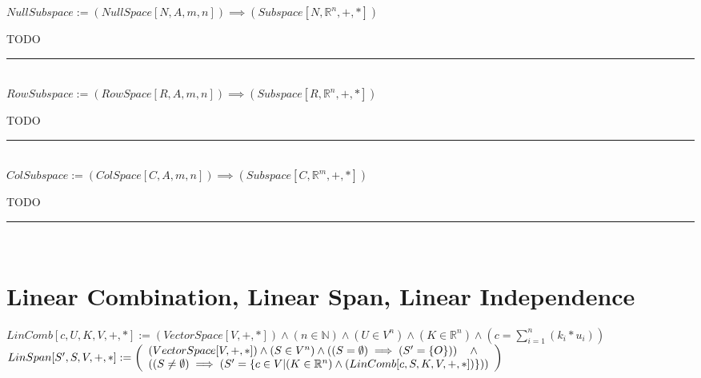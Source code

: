\documentclass{book}
\newcommand{\abr}{:=}
\newcommand{\pr}[1]{\left(#1\right)}
\begin{document}
$NullSubspace \abr (NullSpace[N, A, m, n]) \implies (Subspace[N, \mathbb{R}^n, +, *])$
\begin{enumerate}
  \lit TODO
\end{enumerate} \vspace{.75mm} \hrule \vspace{.75mm} \ \\ 

$RowSubspace \abr (RowSpace[R, A, m, n]) \implies (Subspace[R, \mathbb{R}^n, +, *])$
\begin{enumerate}
  \lit TODO
\end{enumerate} \vspace{.75mm} \hrule \vspace{.75mm} \ \\ 

$ColSubspace \abr (ColSpace[C, A, m, n]) \implies (Subspace[C, \mathbb{R}^m, +, *])$
\begin{enumerate}
  \lit TODO
\end{enumerate} \vspace{.75mm} \hrule \vspace{.75mm} \ \\


\section{Linear Combination, Linear Span, Linear Independence}
$LinComb[c, U, K, V, +, *] \abr (VectorSpace[V, +, *]) \land (n \in \mathbb{N}) \land (U \in V^n) \land (K \in \mathbb{R}^n) \land \pr{c = \sum_{i = 1}^{n}(k_i * u_i)}$ \\
$LinSpan[S', S, V, +, *] \abr \left(\begin{array}{ll}
  (VectorSpace[V, +, *]) \land (S \in V^n) \land \pr{(S = \emptyset) \implies (S' = \{O\})} \hfill \land \hfill \\
  \pr{(S \neq \emptyset) \implies \pr{S' = \{c \in V | (K \in \mathbb{R}^n) \land (LinComb[c, S, K, V, +, *])\}}}
\end{array}\right)$ \\
\end{document}
